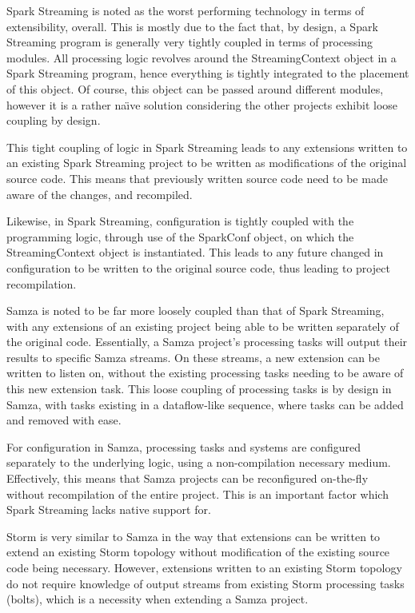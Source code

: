 Spark Streaming is noted as the worst performing technology in terms of extensibility, overall. This is mostly due to
the fact that, by design, a Spark Streaming program is generally very tightly coupled in terms of processing modules.
All processing logic revolves around the StreamingContext object in a Spark Streaming program, hence everything is
tightly integrated to the placement of this object. Of course, this object can be passed around different modules, however
it is a rather na\"{\i}ve solution considering the other projects exhibit loose coupling by design.

This tight coupling of logic in Spark Streaming leads to any extensions written to an existing Spark Streaming project to
be written as modifications of the original source code. This means that previously written source code need to be made
aware of the changes, and recompiled.

Likewise, in Spark Streaming, configuration is tightly coupled with the programming logic, through use of the SparkConf
object, on which the StreamingContext object is instantiated. This leads to any future changed in configuration to be
written to the original source code, thus leading to project recompilation.

Samza is noted to be far more loosely coupled than that of Spark Streaming, with any extensions of an existing project
being able to be written separately of the original code. Essentially, a Samza project's processing tasks will output
their results to specific Samza streams. On these streams, a new extension can be written to listen on, without the
existing processing tasks needing to be aware of this new extension task. This loose coupling of processing tasks is
by design in Samza, with tasks existing in a dataflow-like sequence, where tasks can be added and removed with ease.

For configuration in Samza, processing tasks and systems are configured separately to the underlying logic, using a
non-compilation necessary medium. Effectively, this means that Samza projects can be reconfigured on-the-fly without
recompilation of the entire project. This is an important factor which Spark Streaming lacks native support for.

Storm is very similar to Samza in the way that extensions can be written to extend an existing Storm topology without
modification of the existing source code being necessary. However, extensions written to an existing Storm topology do not
require knowledge of output streams from existing Storm processing tasks (bolts), which is a necessity when extending a
Samza project.

